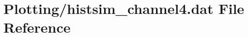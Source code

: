 \hypertarget{Plotting_2histsim__channel4_8dat}{}\section{Plotting/histsim\+\_\+channel4.dat File Reference}
\label{Plotting_2histsim__channel4_8dat}
